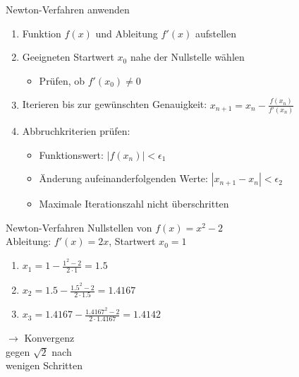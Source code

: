 \begin{KR}{Newton-Verfahren anwenden}
\begin{enumerate}
    \item Funktion $f(x)$ und Ableitung $f'(x)$ aufstellen
    \item Geeigneten Startwert $x_0$ nahe der Nullstelle wählen
    \begin{itemize}
        \item Prüfen, ob $f'(x_0) \neq 0$
    \end{itemize}
    \item Iterieren bis zur gewünschten Genauigkeit:
    $x_{n+1} = x_n - \frac{f(x_n)}{f'(x_n)}$
    \item Abbruchkriterien prüfen:
    \begin{itemize}
        \item Funktionswert: $|f(x_n)| < \epsilon_1$
        \item Änderung aufeinanderfolgenden Werte: $|x_{n+1}-x_n| < \epsilon_2$
        \item Maximale Iterationszahl nicht überschritten
    \end{itemize}
\end{enumerate}
\end{KR}

\begin{example2}{Newton-Verfahren} Nullstellen von $f(x)=x^2-2$\\
Ableitung: $f'(x) = 2x$, Startwert $x_0 = 1$
\vspace{1mm}\\
\begin{minipage}[t]{0.65\textwidth}
    \vspace{-3mm}
    \begin{enumerate}
        \item $x_1 = 1 - \frac{1^2-2}{2 \cdot 1} = 1.5$
        \item $x_2 = 1.5 - \frac{1.5^2-2}{2 \cdot 1.5} = 1.4167$
        \item $x_3 = 1.4167 - \frac{1.4167^2-2}{2 \cdot 1.4167} = 1.4142$
    \end{enumerate}
\end{minipage}
\begin{minipage}[t]{0.3\textwidth}
    $\rightarrow$ Konvergenz \\ gegen $\sqrt{2}$ nach \\ wenigen Schritten
\end{minipage}
\end{example2}

